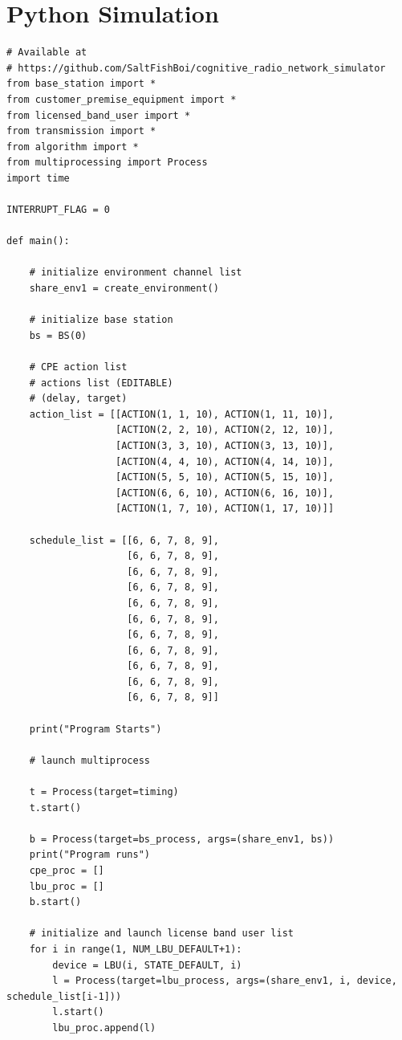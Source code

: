 \chapter{Python Simulation}
\begin{lstlisting}[caption={Selected main process code in Python simulation},captionpos=b]
# Available at
# https://github.com/SaltFishBoi/cognitive_radio_network_simulator 
from base_station import *
from customer_premise_equipment import *
from licensed_band_user import *
from transmission import *
from algorithm import *
from multiprocessing import Process
import time

INTERRUPT_FLAG = 0

def main():

    # initialize environment channel list
    share_env1 = create_environment()

    # initialize base station
    bs = BS(0)

    # CPE action list
    # actions list (EDITABLE)
    # (delay, target)
    action_list = [[ACTION(1, 1, 10), ACTION(1, 11, 10)],
                   [ACTION(2, 2, 10), ACTION(2, 12, 10)],
                   [ACTION(3, 3, 10), ACTION(3, 13, 10)],
                   [ACTION(4, 4, 10), ACTION(4, 14, 10)],
                   [ACTION(5, 5, 10), ACTION(5, 15, 10)],
                   [ACTION(6, 6, 10), ACTION(6, 16, 10)],
                   [ACTION(1, 7, 10), ACTION(1, 17, 10)]]

    schedule_list = [[6, 6, 7, 8, 9],
                     [6, 6, 7, 8, 9],
                     [6, 6, 7, 8, 9],
                     [6, 6, 7, 8, 9],
                     [6, 6, 7, 8, 9],
                     [6, 6, 7, 8, 9],
                     [6, 6, 7, 8, 9],
                     [6, 6, 7, 8, 9],
                     [6, 6, 7, 8, 9],
                     [6, 6, 7, 8, 9],
                     [6, 6, 7, 8, 9]]

    print("Program Starts")

    # launch multiprocess

    t = Process(target=timing)
    t.start()

    b = Process(target=bs_process, args=(share_env1, bs))
    print("Program runs")
    cpe_proc = []
    lbu_proc = []
    b.start()

    # initialize and launch license band user list
    for i in range(1, NUM_LBU_DEFAULT+1):
        device = LBU(i, STATE_DEFAULT, i)
        l = Process(target=lbu_process, args=(share_env1, i, device, schedule_list[i-1]))
        l.start()
        lbu_proc.append(l)


\end{lstlisting}
